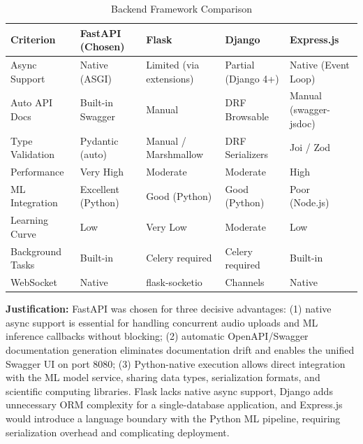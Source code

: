 \documentclass[12pt]{article}
\begin{document}
	\begin{table}[H]
		\centering
		\caption{Backend Framework Comparison}
		\small
		\begin{tabular}{|p{2.2cm}|p{2.2cm}|p{2.2cm}|p{2.2cm}|p{2.2cm}|}
			\hline
			\textbf{Criterion} & \textbf{FastAPI (Chosen)} & \textbf{Flask} & \textbf{Django} & \textbf{Express.js} \\ \hline
			Async Support & Native (ASGI) & Limited (via extensions) & Partial (Django 4+) & Native (Event Loop) \\ \hline
			Auto API Docs & Built-in Swagger & Manual & DRF Browsable & Manual (swagger-jsdoc) \\ \hline
			Type Validation & Pydantic (auto) & Manual / Marshmallow & DRF Serializers & Joi / Zod \\ \hline
			Performance & Very High & Moderate & Moderate & High \\ \hline
			ML Integration & Excellent (Python) & Good (Python) & Good (Python) & Poor (Node.js) \\ \hline
			Learning Curve & Low & Very Low & Moderate & Low \\ \hline
			Background Tasks & Built-in & Celery required & Celery required & Built-in \\ \hline
			WebSocket & Native & flask-socketio & Channels & Native \\ \hline
		\end{tabular}
	\end{table}

	\textbf{Justification:} FastAPI was chosen for three decisive advantages: (1) native async support is essential for handling concurrent audio uploads and ML inference callbacks without blocking; (2) automatic OpenAPI/Swagger documentation generation eliminates documentation drift and enables the unified Swagger UI on port 8080; (3) Python-native execution allows direct integration with the ML model service, sharing data types, serialization formats, and scientific computing libraries. Flask lacks native async support, Django adds unnecessary ORM complexity for a single-database application, and Express.js would introduce a language boundary with the Python ML pipeline, requiring serialization overhead and complicating deployment.
\end{document}
